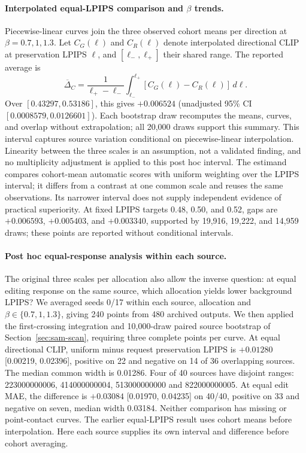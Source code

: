 \documentclass[10pt,doubleanonymous]{ieeeconf}
\begin{document}
\paragraph{Interpolated equal-LPIPS comparison and $\beta$ trends.}
Piecewise-linear curves join the three observed cohort means per direction at $\beta=0.7,1,1.3$. Let $C_G(\ell)$ and $C_R(\ell)$ denote interpolated directional CLIP at preservation LPIPS $\ell$, and $[\ell_-,\ell_+]$ their shared range. The reported average is
\begin{equation}
\overline\Delta_C=\frac{1}{\ell_+-\ell_-}\int_{\ell_-}^{\ell_+}[C_G(\ell)-C_R(\ell)]\,d\ell.
\end{equation}
Over $[0.43297,0.53186]$, this gives $+0.006524$ (unadjusted 95\% CI $[0.0008579,0.0126601]$). Each bootstrap draw recomputes the means, curves, and overlap without extrapolation; all 20,000 draws support this summary. This interval captures source variation conditional on piecewise-linear interpolation. Linearity between the three scales is an assumption, not a validated finding, and no multiplicity adjustment is applied to this post hoc interval. The estimand compares cohort-mean automatic scores with uniform weighting over the LPIPS interval; it differs from a contrast at one common scale and reuses the same observations. Its narrower interval does not supply independent evidence of practical superiority. At fixed LPIPS targets 0.48, 0.50, and 0.52, gaps are $+0.006593$, $+0.005403$, and $+0.003340$, supported by 19,916, 19,222, and 14,959 draws; these points are reported without conditional intervals.

\paragraph{Post hoc equal-response analysis within each source.}
The original three scales per allocation also allow the inverse question: at equal editing response on the same source, which allocation yields lower background LPIPS? We averaged seeds 0/17 within each source, allocation and $\beta\in\{0.7,1,1.3\}$, giving 240 points from 480 archived outputs. We then applied the first-crossing integration and 10,000-draw paired source bootstrap of Section~\ref{sec:sam-scan}, requiring three complete points per curve. At equal directional CLIP, uniform minus request preservation LPIPS is $+0.01280$ [0.00219, 0.02396], positive on 22 and negative on 14 of 36 overlapping sources. The median common width is 0.01286. Four of 40 sources have disjoint ranges: 223000000006, 414000000004, 513000000000 and 822000000005. At equal edit MAE, the difference is $+0.03084$ [0.01970, 0.04235] on 40/40, positive on 33 and negative on seven, median width 0.03184. Neither comparison has missing or point-contact curves. The earlier equal-LPIPS result uses cohort means before interpolation. Here each source supplies its own interval and difference before cohort averaging.
\end{document}
